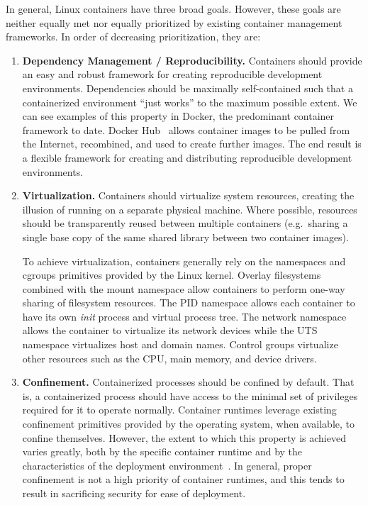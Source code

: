 In general, Linux containers have three broad goals. However, these goals are neither
equally met nor equally prioritized by existing container management frameworks. In order
of decreasing prioritization, they are:
\begin{enumerate}[font=\bfseries]
  \item \textbf{Dependency Management / Reproducibility.}
    Containers should provide an easy and robust framework for creating reproducible
    development environments. Dependencies should be maximally self-contained such that
    a containerized environment \enquote{just works} to the maximum possible extent. We
    can see examples of this property in Docker, the predominant container framework to
    date. Docker Hub~\cite{docker_hub} allows container images to be pulled from the
    Internet, recombined, and used to create further images. The end result is a flexible
    framework for creating and distributing reproducible development environments.

  \item \textbf{Virtualization.}
    Containers should virtualize system resources, creating the illusion of running on
    a separate physical machine. Where possible, resources should be transparently reused
    between multiple containers (e.g.~sharing a single base copy of the same shared
    library between two container images).

    To achieve virtualization, containers generally rely on the namespaces and cgroups
    primitives provided by the Linux kernel.  Overlay filesystems~\cite{overlayfs}
    combined with the mount namespace allow containers to perform one-way sharing of
    filesystem resources. The PID namespace allows each container to have its own
    \textit{init} process and virtual process tree.  The network namespace allows the
    container to virtualize its network devices while the UTS namespace virtualizes host
    and domain names. Control groups virtualize other resources such as the CPU,
    main memory, and device drivers.

  \item \textbf{Confinement.}
    Containerized processes should be confined by default. That is, a containerized
    process should have access to the minimal set of privileges required for it to operate
    normally. Container runtimes leverage existing confinement primitives provided by the
    operating system, when available, to confine themselves. However, the extent to which
    this property is achieved varies greatly, both by the specific container runtime and
    by the characteristics of the deployment
    environment~\cite{sultan2019_container_security, lin2018_container_security,
    bui2015_docker_analysis}. In general, proper confinement is not a high priority of
    container runtimes, and this tends to result in sacrificing security for ease of
    deployment.
\end{enumerate}

